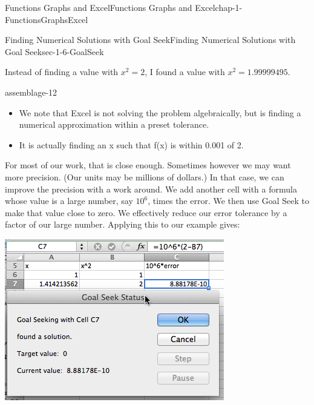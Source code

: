 \documentclass[oneside,10pt,]{book}
\numberwithin{equation}{section}
\begin{document}
\begin{chapterptx}{Functions Graphs and Excel}{}{Functions Graphs and Excel}{}{}{chap-1-FunctionsGraphsExcel}
\begin{sectionptx}{Finding Numerical Solutions with Goal Seek}{}{Finding Numerical Solutions with Goal Seek}{}{}{sec-1-6-GoalSeek}
\begin{sidebyside}{1}{0.1}{0.1}{0}
\begin{sbspanel}{0.8}
\end{sbspanel}%
\end{sidebyside}%
%
\par
\hypertarget{p-477}{}%
Instead of finding a value with \(x^2 = 2\), I found a value with \(x^2 = 1.99999495\). \begin{assemblage}{}{assemblage-12}%
\hypertarget{p-478}{}%
\leavevmode%
\begin{itemize}[label=\textbullet]
\item{}\hypertarget{p-479}{}%
We note that Excel is not solving the problem algebraically, but is finding a numerical approximation within a preset tolerance.%
\item{}\hypertarget{p-480}{}%
It is actually finding an x such that f(x) is within 0.001 of 2.%
\end{itemize}
%
\end{assemblage}
 For most of our work, that is close enough.  Sometimes however we may want more precision.  (Our units may be millions of dollars.)  In that case, we can improve the precision with a work around.  We add another cell with a formula whose value is a large number, say \(10^6\), times the error.  We then use Goal Seek to make that value close to zero.  We effectively reduce our error tolerance by a factor of our large number.  Applying this to our example gives: \begin{sidebyside}{1}{0.1}{0.1}{0}%
\begin{sbspanel}{0.8}%
\includegraphics[width=1\linewidth]{images/sec1-6-5.png}
\end{sbspanel}%
\end{sidebyside}%
%

\end{sectionptx}
\end{chapterptx}
\end{document}
